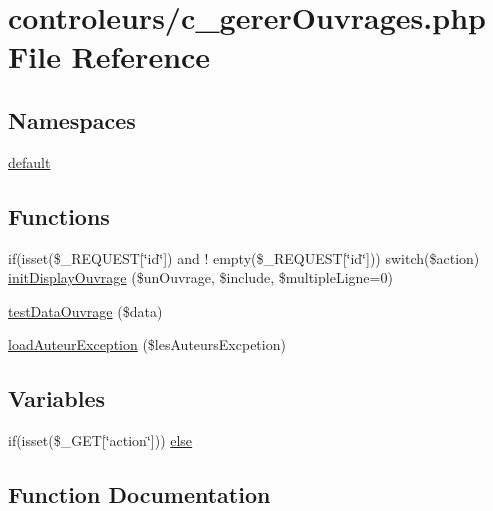 \hypertarget{c__gerer_ouvrages_8php}{}\section{controleurs/c\+\_\+gerer\+Ouvrages.php File Reference}
\label{c__gerer_ouvrages_8php}
\subsection*{Namespaces}
\begin{DoxyCompactItemize}
\item 
 \hyperlink{namespacedefault}{default}
\end{DoxyCompactItemize}
\subsection*{Functions}
\begin{DoxyCompactItemize}
\item 
if(isset(\$\+\_\+\+R\+E\+Q\+U\+E\+ST\mbox{[}\char`\"{}id\char`\"{}\mbox{]}) and ! empty(\$\+\_\+\+R\+E\+Q\+U\+E\+ST\mbox{[}\char`\"{}id\char`\"{}\mbox{]})) switch(\$action) \hyperlink{c__gerer_ouvrages_8php_aef16a9b6187649626a27549f864fdffe}{init\+Display\+Ouvrage} (\$un\+Ouvrage, \$include, \$multiple\+Ligne=0)
\item 
\hyperlink{c__gerer_ouvrages_8php_aa8120b3d81eb0fad49b40c7dfb7ddb2b}{test\+Data\+Ouvrage} (\$data)
\item 
\hyperlink{c__gerer_ouvrages_8php_a92443f573bb08e447d6d8e06287f7511}{load\+Auteur\+Exception} (\$les\+Auteurs\+Excpetion)
\end{DoxyCompactItemize}
\subsection*{Variables}
\begin{DoxyCompactItemize}
\item 
if(isset(\$\+\_\+\+G\+ET\mbox{[}\char`\"{}action\char`\"{}\mbox{]})) \hyperlink{c__gerer_ouvrages_8php_aa4db7f7a27517cf5cd3ff1f2577caa64}{else}
\end{DoxyCompactItemize}


\subsection{Function Documentation}
\mbox{\label{c__gerer_ouvrages_8php_aef16a9b6187649626a27549f864fdffe}} 
